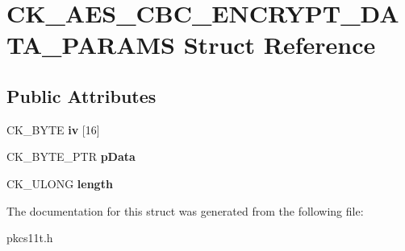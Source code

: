 \hypertarget{struct_c_k___a_e_s___c_b_c___e_n_c_r_y_p_t___d_a_t_a___p_a_r_a_m_s}{}\section{C\+K\+\_\+\+A\+E\+S\+\_\+\+C\+B\+C\+\_\+\+E\+N\+C\+R\+Y\+P\+T\+\_\+\+D\+A\+T\+A\+\_\+\+P\+A\+R\+A\+MS Struct Reference}
\label{struct_c_k___a_e_s___c_b_c___e_n_c_r_y_p_t___d_a_t_a___p_a_r_a_m_s}
\subsection*{Public Attributes}
\begin{DoxyCompactItemize}
\item 
\mbox{\label{struct_c_k___a_e_s___c_b_c___e_n_c_r_y_p_t___d_a_t_a___p_a_r_a_m_s_a78a7a1afad5347f031b78ef05d45d9f0}} 
C\+K\+\_\+\+B\+Y\+TE {\bfseries iv} \mbox{[}16\mbox{]}
\item 
\mbox{\label{struct_c_k___a_e_s___c_b_c___e_n_c_r_y_p_t___d_a_t_a___p_a_r_a_m_s_a620cb164c9631f252741d77f9cd56b1e}} 
C\+K\+\_\+\+B\+Y\+T\+E\+\_\+\+P\+TR {\bfseries p\+Data}
\item 
\mbox{\label{struct_c_k___a_e_s___c_b_c___e_n_c_r_y_p_t___d_a_t_a___p_a_r_a_m_s_a0126d4f85f76160280fbe734e50a63f0}} 
C\+K\+\_\+\+U\+L\+O\+NG {\bfseries length}
\end{DoxyCompactItemize}


The documentation for this struct was generated from the following file\+:\begin{DoxyCompactItemize}
\item 
pkcs11t.\+h\end{DoxyCompactItemize}
